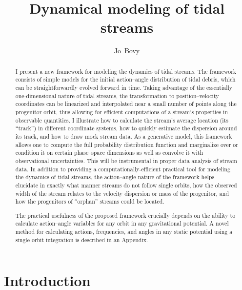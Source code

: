 \documentclass{emulateapj}
\newcounter{address}
\begin{document}
\title{Dynamical modeling of tidal streams}
\author{Jo~Bovy\altaffilmark{\ref{Hubble}}}

\begin{abstract} 
  I present a new framework for modeling the dynamics of tidal
  streams. The framework consists of simple models for the initial
  action--angle distribution of tidal debris, which can be
  straightforwardly evolved forward in time. Taking advantage of the
  essentially one-dimensional nature of tidal streams, the
  transformation to position--velocity coordinates can be linearized
  and interpolated near a small number of points along the progenitor
  orbit, thus allowing for efficient computations of a stream's
  properties in observable quantities. I illustrate how to calculate
  the stream's average location (its ``track'') in different
  coordinate systems, how to quickly estimate the dispersion around
  its track, and how to draw mock stream data. As a generative model,
  this framework allows one to compute the full probability
  distribution function and marginalize over or condition it on
  certain phase--space dimensions as well as convolve it with
  observational uncertainties. This will be instrumental in proper
  data analysis of stream data. In addition to providing a
  computationally-efficient practical tool for modeling the dynamics
  of tidal streams, the action--angle nature of the framework helps
  elucidate in exactly what manner streams do not follow single
  orbits, how the observed width of the stream relates to the velocity
  dispersion or mass of the progenitor, and how the progenitors of
  ``orphan'' streams could be located.

  The practical usefulness of the proposed framework crucially depends
  on the ability to calculate action--angle variables for any orbit in
  any gravitational potential. A novel method for calculating actions,
  frequencies, and angles in any static potential using a single orbit
  integration is described in an Appendix.
\end{abstract}



\section{Introduction}
\end{document}

